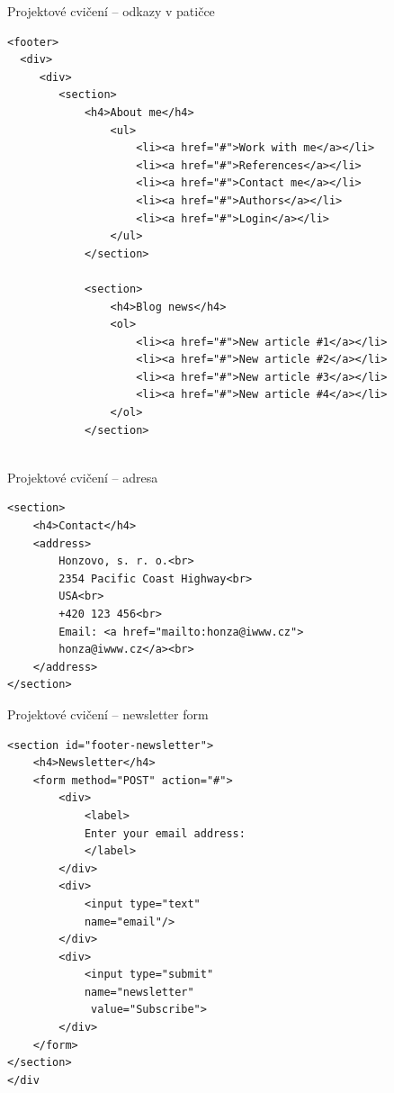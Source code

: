 \documentclass{beamer}
\begin{document}
\begin{frame}[fragile, shrink=0]{Projektové cvičení -- odkazy v patičce}

\begin{lstlisting}[language=HTML5]
<footer>
  <div>
     <div>
        <section>
        	<h4>About me</h4>
                <ul>
                    <li><a href="#">Work with me</a></li>
                    <li><a href="#">References</a></li>
                    <li><a href="#">Contact me</a></li>
                    <li><a href="#">Authors</a></li>
                    <li><a href="#">Login</a></li>
                </ul>
            </section>

            <section>
                <h4>Blog news</h4>
                <ol>
                    <li><a href="#">New article #1</a></li>
                    <li><a href="#">New article #2</a></li>
                    <li><a href="#">New article #3</a></li>
                    <li><a href="#">New article #4</a></li>
                </ol>
            </section>
            
\end{lstlisting}
	
\end{frame}



\begin{frame}[fragile, shrink=0]{Projektové cvičení -- adresa}

\begin{lstlisting}[language=HTML5]     
<section>
    <h4>Contact</h4>
    <address>
        Honzovo, s. r. o.<br>
        2354 Pacific Coast Highway<br>
        USA<br>
        +420 123 456<br>
        Email: <a href="mailto:honza@iwww.cz">
        honza@iwww.cz</a><br>
    </address>
</section>
\end{lstlisting}
	
\end{frame}




\begin{frame}[fragile, shrink=0]{Projektové cvičení -- newsletter form }

\begin{lstlisting}[language=HTML5]
<section id="footer-newsletter">
    <h4>Newsletter</h4>
    <form method="POST" action="#">
        <div>
            <label>
            Enter your email address: 
            </label>
        </div>
        <div>
            <input type="text" 
            name="email"/>
        </div>
        <div>
            <input type="submit" 
            name="newsletter"
             value="Subscribe">
        </div>
    </form>
</section>    
</div   
\end{lstlisting}
	
\end{frame}
\end{document}

